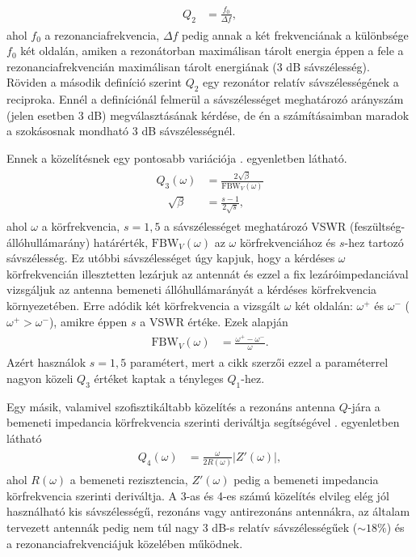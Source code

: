 		\begin{align}
			\begin{split}\label{equ:Q2}
				Q_2 & = \frac{f_0}{\Delta f},
			\end{split}
		\end{align}
		ahol $f_0$ a rezonanciafrekvencia, $\Delta f$ pedig annak a két frekvenciának a különbsége $f_0$ két oldalán, amiken a rezonátorban maximálisan tárolt energia éppen a fele a rezonanciafrekvencián maximálisan tárolt energiának (3 dB sávszélesség). Röviden a második definíció szerint $Q_2$ egy rezonátor relatív sávszélességének a reciproka. Ennél a definíciónál felmerül a sávszélességet meghatározó arányszám (jelen esetben 3 dB) megválasztásának kérdése, de én a számításaimban maradok a szokásosnak mondható 3 dB sávszélességnél.
		\par Ennek a közelítésnek egy pontosabb variációja \cite{ibqa} . egyenletben látható.
		\begin{align}
			\begin{split}\label{equ:Q3}
				Q_3(\omega) & = \frac{2 \sqrt{\beta}}{\text{FBW}_V(\omega)} \\[0.5em]
				\quad \sqrt{\beta} & = \frac{s-1}{2\sqrt{s}},
			\end{split}
		\end{align}
		ahol $\omega$ a körfrekvencia, $s=1,5$ a sávszélességet meghatározó VSWR (feszültség-állóhullámarány) határérték, $\text{FBW}_{V}(\omega)$ az $\omega$ körfrekvenciához és $s$-hez tartozó sávszélesség. Ez utóbbi sávszélességet úgy kapjuk, hogy a kérdéses $\omega$ körfrekvencián illesztetten lezárjuk az antennát és ezzel a fix lezáróimpedanciával vizsgáljuk az antenna bemeneti állóhullámarányát a kérdéses körfrekvencia környezetében. Erre adódik két körfrekvencia a vizsgált $\omega$ két oldalán: $\omega^+$ és $\omega^-$ ($\omega^+ > \omega^-$), amikre éppen $s$ a VSWR értéke. Ezek alapján
		\begin{align}
			\begin{split}
				\text{FBW}_V(\omega) & = \frac{\omega^+ - \omega^-}{\omega}.
			\end{split}
		\end{align}
		 Azért használok $s=1,5$ paramétert, mert a \cite{ibqa} cikk szerzői ezzel a paraméterrel nagyon közeli $Q_3$ értéket kaptak a tényleges $Q_1$-hez.
		\par Egy másik, valamivel szofisztikáltabb közelítés a rezonáns antenna $Q$-jára a bemeneti impedancia körfrekvencia szerinti deriváltja segítségével \cite{ibqa} . egyenletben látható 
		\begin{align}
			\begin{split}\label{equ:Q4}
				Q_4(\omega) & = \frac{\omega}{2 R(\omega)}|Z'(\omega)|,
			\end{split}
		\end{align}
		ahol $R(\omega)$ a bemeneti rezisztencia, $Z'(\omega)$ pedig a bemeneti impedancia körfrekvencia szerinti deriváltja. A 3-as és 4-es számú közelítés elvileg elég jól használható kis sávszélességű, rezonáns vagy antirezonáns antennákra, az általam tervezett antennák pedig nem túl nagy 3 dB-s relatív sávszélességűek ($\sim 18\%$) és a rezonanciafrekvenciájuk közelében működnek.
